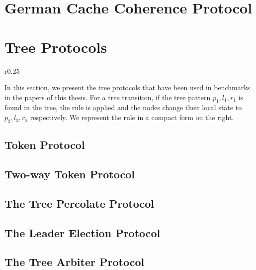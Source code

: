 \section{German Cache Coherence Protocol}
\ifnoexperiments\else\fi

\section{Tree Protocols}
\noindent%
\begin{wrapfigure}{r}{0.25\linewidth}    
  \hfill%
\end{wrapfigure}
% 
In this section, we present the tree protocols that have been used in
benchmarks in the papers of this thesis.
%
For a tree transition, if the tree pattern $p_1,l_1,r_1$ is found in
the tree, the rule is applied and the nodes change their local state
to $p_2,l_2,r_2$ respectively.
% 
We represent the rule in a compact form on the right.

\subsection{Token Protocol}
\ifnoexperiments\else\fi
\subsection{Two-way Token Protocol}
\ifnoexperiments\else\fi
\subsection{The Tree Percolate Protocol}
\ifnoexperiments\else\fi
\subsection{The Leader Election Protocol}
\ifnoexperiments\else\fi
\subsection{The Tree Arbiter Protocol}
\ifnoexperiments\else\fi
